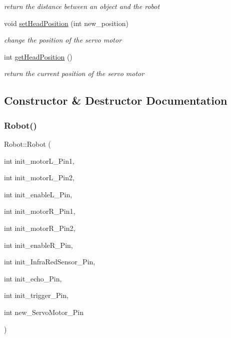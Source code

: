 \begin{DoxyCompactItemize}
\begin{DoxyCompactList}\small\item\em return the distance between an object and the robot \end{DoxyCompactList}\item 
void \hyperlink{class_robot_a69dad285c5a86e600b2ad94e7d30cf8b}{set\+Head\+Position} (int new\+\_\+position)
\begin{DoxyCompactList}\small\item\em change the position of the servo motor \end{DoxyCompactList}\item 
int \hyperlink{class_robot_a34039e49403d45d263e834f11d9c85e9}{get\+Head\+Position} ()
\begin{DoxyCompactList}\small\item\em return the current position of the servo motor \end{DoxyCompactList}\end{DoxyCompactItemize}


\subsection{Constructor \& Destructor Documentation}
\mbox{\label{class_robot_a48d1e4e995ff63500905212178deb76a}} 
\subsubsection{\texorpdfstring{Robot()}{Robot()}}
{\footnotesize\ttfamily Robot\+::\+Robot (\begin{DoxyParamCaption}\item[{int}]{init\+\_\+motor\+L\+\_\+\+Pin1,  }\item[{int}]{init\+\_\+motor\+L\+\_\+\+Pin2,  }\item[{int}]{init\+\_\+enable\+L\+\_\+\+Pin,  }\item[{int}]{init\+\_\+motor\+R\+\_\+\+Pin1,  }\item[{int}]{init\+\_\+motor\+R\+\_\+\+Pin2,  }\item[{int}]{init\+\_\+enable\+R\+\_\+\+Pin,  }\item[{int}]{init\+\_\+\+Infra\+Red\+Sensor\+\_\+\+Pin,  }\item[{int}]{init\+\_\+echo\+\_\+\+Pin,  }\item[{int}]{init\+\_\+trigger\+\_\+\+Pin,  }\item[{int}]{new\+\_\+\+Servo\+Motor\+\_\+\+Pin }\end{DoxyParamCaption})}



